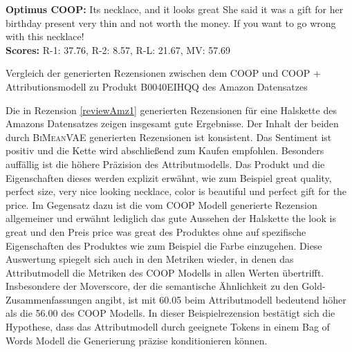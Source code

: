 \begin{Rezension}[!h]
{{        %
        \textbf{Optimus COOP:}  Its \ccolorbox[BackgroundColor]{ \textcolor{HighlightColor}{a beautiful}} \textcolor{HighlightColor}{necklace}\textcolor{HighlightColor}{,} \textcolor{HighlightColor}{and} \textcolor{HighlightColor}{it} looks \textcolor{HighlightColor}{great} \underline{\ccolorbox[BackgroundColor]{ \textcolor{HighlightColor}{for the}} \ccolorbox[BackgroundColor]{ \textcolor{HighlightColor}{price.}}} She said \textcolor{HighlightColor}{it} was \textcolor{HighlightColor}{a} gift \textcolor{HighlightColor}{for} her birthday present\ccolorbox[BackgroundColor]{\textcolor{HighlightColor}{, but}} \ccolorbox[BackgroundColor]{ \textcolor{HighlightColor}{it is}} \textcolor{HighlightColor}{very} \textcolor{HighlightColor}{thin} \textcolor{HighlightColor}{and} not worth \textcolor{HighlightColor}{the} money\textcolor{HighlightColor}{.} If \textcolor{HighlightColor}{you} want \textcolor{HighlightColor}{to} go wrong with \textcolor{HighlightColor}{this} \textcolor{HighlightColor}{necklace}\textcolor{HighlightColor}{!}  \\ 
        \textbf{Scores:} R-1: 37.76, R-2: 8.57, R-L: 21.67, MV: 57.69 }
    
        }
    \caption{Vergleich der generierten Rezensionen zwischen dem COOP und COOP + Attributionsmodell zu Produkt B0040EIHQQ des Amazon Datensatzes}
\label{reviewAmz1}
\end{Rezension}

Die in Rezension \ref{reviewAmz1} generierten Rezensionen für eine Halskette des Amazons Datensatzes zeigen insgesamt gute Ergebnisse.
Der Inhalt der beiden durch \textsc{BiMeanVAE} generierten Rezensionen ist konsistent. 
Das Sentiment ist positiv und die Kette wird abschließend zum Kaufen empfohlen. Besonders auffällig ist die höhere Präzision des Attributmodells. Das Produkt und die Eigenschaften dieses werden explizit erwähnt, wie zum Beispiel \glqq{}great quality\grqq{}, \glqq{}perfect size\grqq{}, \glqq{}very nice looking necklace\grqq{}, \glqq{}color is beautiful\grqq{} und \glqq{}perfect gift for the price\grqq{}.
Im Gegensatz dazu ist die vom COOP Modell generierte Rezension allgemeiner und erwähnt lediglich das gute Aussehen der Halskette \glqq{}the look is great\grqq{} und den Preis \glqq{}price was great\grqq{} des Produktes ohne auf spezifische Eigenschaften des Produktes wie zum Beispiel die Farbe einzugehen.
Diese Auswertung spiegelt sich auch in den Metriken wieder, in denen das Attributmodell die Metriken des COOP Modells in allen Werten übertrifft. 
Insbesondere der Moverscore, der die semantische Ähnlichkeit zu den Gold-Zusammenfassungen angibt, ist mit 60.05 beim Attributmodell bedeutend höher als die 56.00 des COOP Modells.
In dieser Beispielrezension bestätigt sich die Hypothese, dass das Attributmodell durch geeignete Tokens in einem Bag of Words Modell die Generierung präzise konditionieren können.

